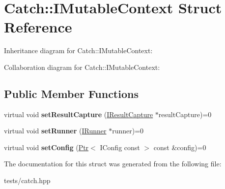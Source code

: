 \hypertarget{struct_catch_1_1_i_mutable_context}{}\section{Catch\+:\+:I\+Mutable\+Context Struct Reference}
\label{struct_catch_1_1_i_mutable_context}


Inheritance diagram for Catch\+:\+:I\+Mutable\+Context\+:


Collaboration diagram for Catch\+:\+:I\+Mutable\+Context\+:
\subsection*{Public Member Functions}
\begin{DoxyCompactItemize}
\item 
\mbox{\label{struct_catch_1_1_i_mutable_context_a4a80afd0525b7def21bee8d9b48f2d39}} 
virtual void {\bfseries set\+Result\+Capture} (\hyperlink{struct_catch_1_1_i_result_capture}{I\+Result\+Capture} $\ast$result\+Capture)=0
\item 
\mbox{\label{struct_catch_1_1_i_mutable_context_af2e53b1dea4527a2587cff266a730f6e}} 
virtual void {\bfseries set\+Runner} (\hyperlink{struct_catch_1_1_i_runner}{I\+Runner} $\ast$runner)=0
\item 
\mbox{\label{struct_catch_1_1_i_mutable_context_a013e8f688a8ea7970262d07ead542a63}} 
virtual void {\bfseries set\+Config} (\hyperlink{class_catch_1_1_ptr}{Ptr}$<$ I\+Config const $>$ const \&config)=0
\end{DoxyCompactItemize}


The documentation for this struct was generated from the following file\+:\begin{DoxyCompactItemize}
\item 
tests/catch.\+hpp\end{DoxyCompactItemize}
